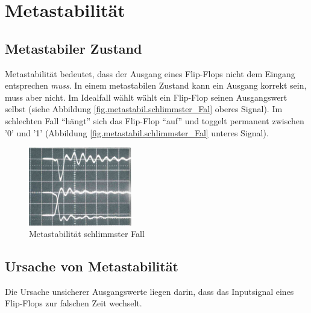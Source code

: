 
\chapter{Metastabilität}\label{chap.metastabilitat}

\section{Metastabiler Zustand}\label{sect.meatastabil_def}
Metastabilität bedeutet, dass der Ausgang eines Flip-Flops nicht dem Eingang entsprechen \textit{muss}. In einem metastabilen Zustand kann ein Ausgang korrekt sein, muss aber nicht.
Im Idealfall wählt wählt ein Flip-Flop seinen Ausgangswert selbst (siehe Abbildung \ref{fig.metastabil.schlimmster_Fal} oberes Signal). Im schlechten Fall “hängt” sich das Flip-Flop “auf” und toggelt permanent zwischen '0' und '1' (Abbildung \ref{fig.metastabil.schlimmster_Fal} unteres Signal).

\begin{figure}[H]
	\includegraphics[width=0.4\textwidth]{images/metastability/metastability_2_IO.png}
	\caption{Metastabilität schlimmster Fall \cite{F_metastability}}
	\label{fig.metastabil.schlimmster_Fall}
\end{figure}


\section{Ursache von Metastabilität}\label{sect.meatastabil_ursache}

Die Ursache unsicherer Ausgangswerte liegen darin, dass das Inputsignal eines Flip-Flops zur falschen Zeit wechselt.

